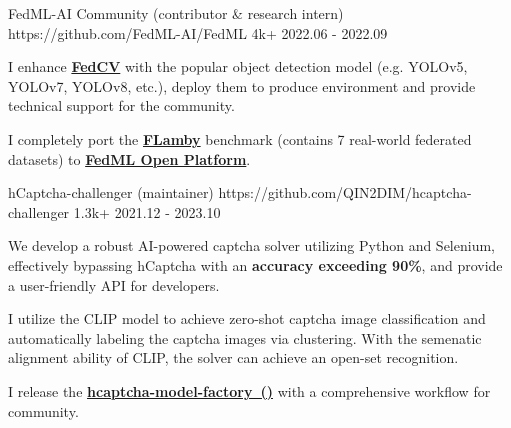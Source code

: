 
\begin{cventries}

\cvproject
{FedML-AI Community (contributor \& research intern)} %
{https://github.com/FedML-AI/FedML} %
{4k+} %
{2022.06 - 2022.09} %
{
\begin{cvitems} %
\item {I enhance \href{https://github.com/FedML-AI/FedCV}{\textbf{FedCV}} with the popular object detection model (e.g. YOLOv5, YOLOv7, YOLOv8, etc.), deploy them to produce environment and provide technical support for the community.}
\item {I completely port the \href{https://github.com/owkin/FLamby}{\textbf{FLamby}} benchmark (contains 7 real-world federated datasets) to \href{https://open.fedml.ai/}{\textbf{FedML Open Platform}}.}
\end{cvitems}
} %



\cvproject
{hCaptcha-challenger (maintainer)} %
{https://github.com/QIN2DIM/hcaptcha-challenger} %
{1.3k+} %
{2021.12 - 2023.10} %
{
\begin{cvitems} %
\item {We develop a robust AI-powered captcha solver utilizing Python and Selenium, effectively bypassing hCaptcha with an \textbf{accuracy exceeding 90\%}, and provide a user-friendly API for developers.}
\item {I utilize the CLIP model to achieve zero-shot captcha image classification and automatically labeling the captcha images via clustering. With the semenatic alignment ability of CLIP, the solver can achieve an open-set recognition.}
\item {I release the \href{https://github.com/CaptchaAgent/hcaptcha-model-factory}{\textbf{hcaptcha-model-factory~()}} with a comprehensive workflow for community.}
\end{cvitems}
} %



\end{cventries}
